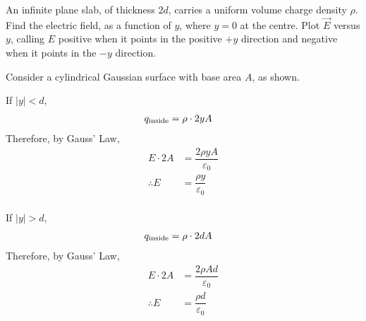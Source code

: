 \documentclass[fleqn, a4paper, 12pt, oneside]{amsart}
\theoremstyle{definition}
\theoremstyle{theorem}
\begin{document}
\begin{question}
	An infinite plane slab, of thickness $2d$, carries a uniform volume charge density $\rho$. Find the electric field, as a function of $y$, where $y = 0$ at the centre. Plot $\overrightarrow{E}$ versus $y$, calling $E$ positive when it points in the positive $+y$ direction and negative when it points in the $-y$ direction.
\end{question}

\begin{solution}
	Consider a cylindrical Gaussian surface with base area $A$, as shown.
	\begin{figure}[H]
	\end{figure}
	If $|y| < d$,
	\begin{align*}
		q_{\textnormal{inside}} &= \rho \cdot 2 y A
	\end{align*}
	Therefore, by Gauss' Law,
	\begin{align*}
		E \cdot 2A &= \dfrac{2 \rho y A}{\varepsilon_0}\\
		\therefore E &= \dfrac{\rho y}{\varepsilon_0}
	\end{align*}
	~\\
	If $|y| > d$,
	\begin{align*}
		q_{\textnormal{inside}} &= \rho \cdot 2d A
	\end{align*}
	Therefore, by Gauss' Law, 
	\begin{align*}
		E \cdot 2A &= \dfrac{2 \rho A d}{\varepsilon_0}\\
		\therefore E &= \dfrac{\rho d}{\varepsilon_0}
	\end{align*}
	\begin{figure}[H]
	\end{figure}
\end{solution}
\end{document}
